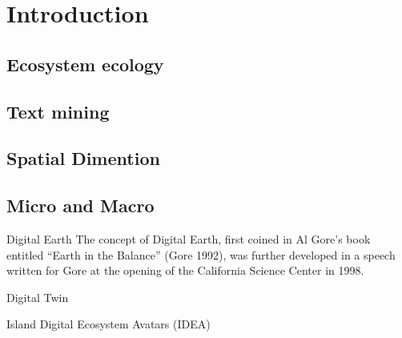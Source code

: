 % 
% 


\chapter{Introduction}
\label{cha:intro}



\section{Ecosystem ecology}
\label{sec:intro-ecosystem}

\section{Text mining}
\label{sec:text-mining}

\section{Spatial Dimention}
\label{sec:crete-spatial}

\section{Micro and Macro}
\label{sec:crete-micro-macro}


Digital Earth
The concept of Digital Earth, first coined in Al Gore’s book entitled 
“Earth in the Balance” (Gore 1992), was further developed in a speech
written for Gore at the opening of the California Science Center in 1998.

Digital Twin

Island Digital Ecosystem Avatars (IDEA)


